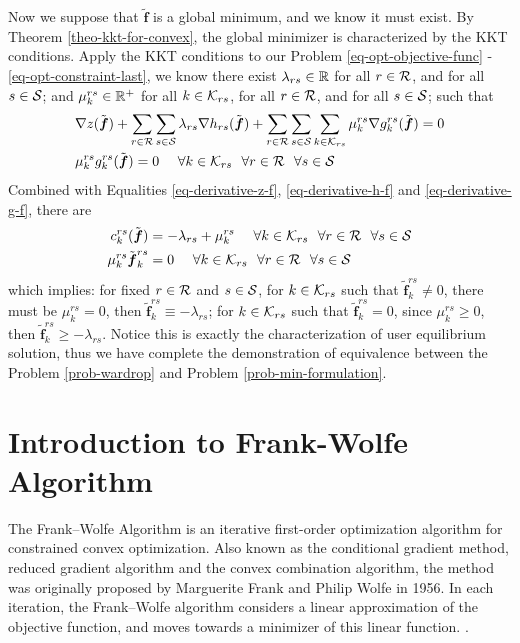 \documentclass{article}
\begin{document}
Now we suppose that $ \tilde{\boldsymbol{f}} $ is a global minimum, and we know it must exist. By Theorem \ref{theo-kkt-for-convex}, the global minimizer is characterized by the KKT conditions. Apply the KKT conditions to our Problem \ref{eq-opt-objective-func} - \ref{eq-opt-constraint-last}, we know there exist $ \lambda_{rs} \in \mathbb{R} $ for all $ r \in \mathcal{R} $, and for all $ s \in \mathcal{S} $; and $ \mu^{rs}_k \in \mathbb{R}^+ $ for all $ k \in \mathcal{K}_{rs} $, for all $ r \in \mathcal{R} $, and for all $ s \in \mathcal{S} $; such that 
\begin{align}
    &\nabla z (\tilde{\boldsymbol{f}}) + \sum_{r \in \mathcal{R}} \sum_{s \in \mathcal{S}} \lambda_{rs} \nabla h_{rs} (\tilde{\boldsymbol{f}}) + \sum_{r \in \mathcal{R}} \sum_{s \in \mathcal{S}} \sum_{k \in \mathcal{K}_{rs}} \mu_k^{rs} \nabla g_k^{rs} (\tilde{\boldsymbol{f}}) = 0 \\ 
    &\mu_k^{rs} g_k^{rs} (\tilde{\boldsymbol{f}}) = 0 ~~~~ \forall k \in \mathcal{K}_{rs} ~~ \forall r \in \mathcal{R} ~~ \forall s \in \mathcal{S}
\end{align}
Combined with Equalities \ref{eq-derivative-z-f}, \ref{eq-derivative-h-f} and \ref{eq-derivative-g-f}, there are
\begin{align}
    c_k^{rs} (\tilde{\boldsymbol{f}}) &= - \lambda_{rs} + \mu_k^{rs} ~~~~ \forall k \in \mathcal{K}_{rs} ~~ \forall r \in \mathcal{R} ~~ \forall s \in \mathcal{S} \\ 
    \mu_k^{rs} \tilde{\boldsymbol{f}}^{rs}_k &= 0 ~~~~ \forall k \in \mathcal{K}_{rs} ~~ \forall r \in \mathcal{R} ~~ \forall s \in \mathcal{S}
\end{align}
which implies: for fixed $ r \in \mathcal{R} $ and $ s \in \mathcal{S} $, for $ k \in \mathcal{K}_{rs} $ such that $ \tilde{\boldsymbol{f}}^{rs}_k \neq 0 $, there must be $ \mu_k^{rs} = 0 $, then $ \tilde{\boldsymbol{f}}^{rs}_k \equiv - \lambda_{rs} $; for $ k \in \mathcal{K}_{rs} $ such that $ \tilde{\boldsymbol{f}}^{rs}_k = 0 $, since $ \mu_k^{rs} \ge 0 $, then $ \tilde{\boldsymbol{f}}^{rs}_k \ge - \lambda_{rs} $. Notice this is exactly the characterization of user equilibrium solution, thus we have complete the demonstration of equivalence between the Problem \ref{prob-wardrop} and Problem \ref{prob-min-formulation}.

\section{Introduction to Frank-Wolfe Algorithm}

The Frank–Wolfe Algorithm is an iterative first-order optimization algorithm for constrained convex optimization. Also known as the conditional gradient method, reduced gradient algorithm and the convex combination algorithm, the method was originally proposed by Marguerite Frank and Philip Wolfe in 1956. In each iteration, the Frank–Wolfe algorithm considers a linear approximation of the objective function, and moves towards a minimizer of this linear function. \cite{wiki:xxx}.
\end{document}
